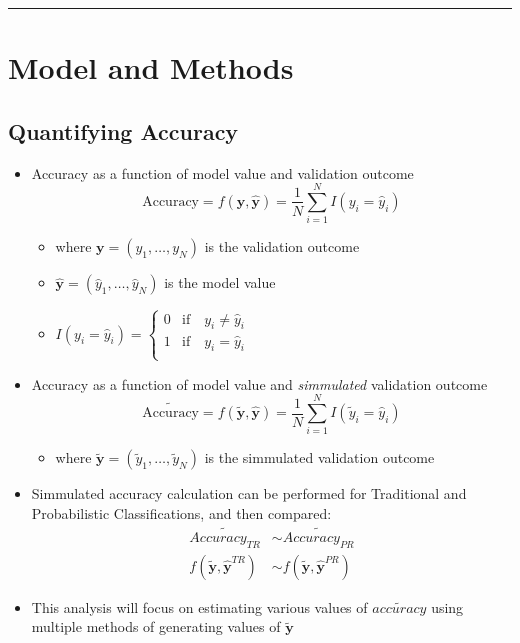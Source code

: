\documentclass[12pt,]{article}
\providecommand{\tightlist}{%
  \setlength{\itemsep}{0pt}\setlength{\parskip}{0pt}}
\begin{document}
\begin{center}\rule{0.5\linewidth}{\linethickness}\end{center}

\hypertarget{model-and-methods}{%
\section{Model and Methods}\label{model-and-methods}}

\hypertarget{quantifying-accuracy}{%
\subsection{Quantifying Accuracy}\label{quantifying-accuracy}}

\begin{itemize}
\tightlist
\item
  Accuracy as a function of model value and validation outcome
  \[\text{Accuracy} = f(\mathbf{y}, \mathbf{\hat{y}}) = \frac{1}{N} \sum_{i=1}^{N}  I\left(y_{i}=\hat{y}_{i} \right)\]

  \begin{itemize}
  \tightlist
  \item
    where \(\mathbf{y}=\left(y_{1}, \ldots, y_{N}\right)\) is the
    validation outcome
  \item
    \(\mathbf{\hat{y}}=\left(\hat{y}_{1},\ldots, \hat{y}_{N} \right)\)
    is the model value
  \item
    \(I\left(y_{i}=\hat{y}_{i} \right)=\begin{cases} 0 &\mbox{if} \quad y_{i} \neq \hat{y}_{i} \\ 1 &\mbox{if} \quad y_{i} = \hat{y}_{i} \\ \end{cases}\)
  \end{itemize}
\item
  Accuracy as a function of model value and \textit{simmulated}
  validation outcome
  \[\tilde{\text{Accuracy}} = f(\mathbf{\tilde{y}}, \mathbf{\hat{y}}) = \frac{1}{N} \sum_{i=1}^{N}  I\left(\tilde{y}_{i}=\hat{y}_{i} \right)\]

  \begin{itemize}
  \tightlist
  \item
    where
    \(\mathbf{\tilde{y}}=\left(\tilde{y}_{1}, \ldots, \tilde{y}_{N} \right)\)
    is the simmulated validation outcome
  \end{itemize}
\item
  Simmulated accuracy calculation can be performed for Traditional and
  Probabilistic Classifications, and then compared: \begin{align*}
  \tilde{Accuracy_{TR}} &\sim \tilde{Accuracy_{PR}} \\[0.5em]
  f\left(\mathbf{\tilde{y}}, \mathbf{\hat{y}}^{TR} \right)  &\sim f\left(\mathbf{\tilde{y}}, \mathbf{\hat{y}}^{PR} \right) \tag{2.1-1} \label{2.1-1}
  \end{align*}
\item
  This analysis will focus on estimating various values of
  \(\tilde{accuracy}\) using multiple methods of generating values of
  \(\tilde{\mathbf{y}}\)
\end{itemize}
\end{document}
